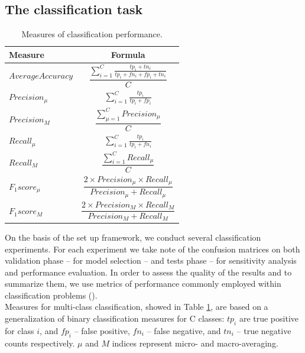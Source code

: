 \subsection{The classification task}
\begin{table}
	\begin{center}
		\begin{tabular}{|l|c|}
			\hline
			\textbf{Measure} & \textbf{Formula} \\ 
			\hline
			$Average Accuracy$ & $\dfrac{\sum_{i=1}^{C} \frac{tp_i+tn_i}{tp_i+fn_i+fp_i+tn_i}}{C}$ \\
			$Precision_\mu$ & $\sum_{i=1}^{C} \frac{tp_i}{tp_i+fp_i}$ \\
			$Precision_M$ & $\dfrac{\sum_{\mu=1}^{C} Precision_\mu}{C}$ \\
			$Recall_\mu$ & $\sum_{i=1}^{C} \frac{tp_i}{tp_i+fn_i}$ \\
			$Recall_M$ & $\dfrac{\sum_{i=1}^{C} Recall_\mu}{C}$ \\
			$F_1 score_\mu$ & $\dfrac{2\times Precision_\mu \times Recall_\mu}{Precision_\mu+Recall_\mu}$ \\
			$F_1 score_M$ & $\dfrac{2\times Precision_M \times Recall_M}{Precision_M+Recall_M}$ \\
			\hline
		\end{tabular}
	\end{center}
	\caption{Measures of classification performance.}
	\label{table:1}
	\vspace{-16pt}
\end{table}
On the basis of the set up framework, we conduct several classification experiments. For each experiment we take note of the confusion matrices on both validation phase -- for model selection -- and tests phase -- for sensitivity analysis and performance evaluation. In order to assess the quality of the results and to summarize them, we use metrics of performance commonly employed within classification problems (\cite{ref}).
\\\indent
Measures for multi-class classification, showed in Table \ref{table:1}, are based on a generalization of binary classification measures for C classes: $tp_i$ are true positive for class $i$, and $fp_i$ – false positive, $fn_i$ – false negative, and $tn_i$ – true negative counts respectively. $\mu$ and $M$ indices represent micro- and macro-averaging.
